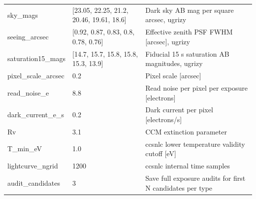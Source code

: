 \begin{longtable}{p{.29\linewidth}p{.25\linewidth}p{.37\linewidth}}
sky\_mags & [23.05, 22.25, 21.2, 20.46, 19.61, 18.6] & Dark sky AB mag per square arcsec, ugrizy \\
seeing\_arcsec & [0.92, 0.87, 0.83, 0.8, 0.78, 0.76] & Effective zenith PSF FWHM [arcsec], ugrizy \\
saturation15\_mags & [14.7, 15.7, 15.8, 15.8, 15.3, 13.9] & Fiducial 15 s saturation AB magnitudes, ugrizy \\
pixel\_scale\_arcsec & 0.2 & Pixel scale [arcsec] \\
read\_noise\_e & 8.8 & Read noise per pixel per exposure [electrons] \\
dark\_current\_e\_s & 0.2 & Dark current per pixel [electrons/s] \\
Rv & 3.1 & CCM extinction parameter \\
T\_min\_eV & 1.0 & ccsnlc lower temperature validity cutoff [eV] \\
lightcurve\_ngrid & 1200 & ccsnlc internal time samples \\
audit\_candidates & 3 & Save full exposure audits for first N candidates per type \\
\bottomrule\end{longtable}